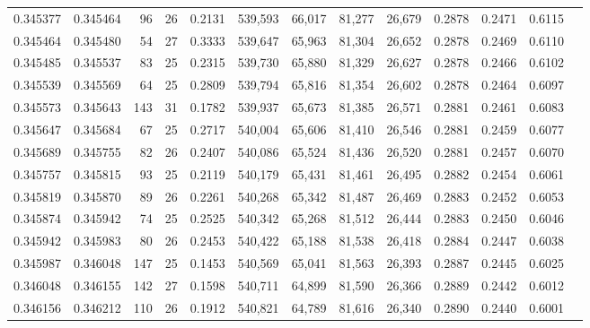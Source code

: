 \begin{tabular}{rrrrrrrrrrrrr}
0.345377 & 0.345464 &    96 &  26 &                                     0.2131 & 539,593 &  66,017 &  81,277 &  26,679 & 0.2878 & 0.2471 & 0.6115 \\
0.345464 & 0.345480 &    54 &  27 &                                     0.3333 & 539,647 &  65,963 &  81,304 &  26,652 & 0.2878 & 0.2469 & 0.6110 \\
0.345485 & 0.345537 &    83 &  25 &                                     0.2315 & 539,730 &  65,880 &  81,329 &  26,627 & 0.2878 & 0.2466 & 0.6102 \\
0.345539 & 0.345569 &    64 &  25 &                                     0.2809 & 539,794 &  65,816 &  81,354 &  26,602 & 0.2878 & 0.2464 & 0.6097 \\
0.345573 & 0.345643 &   143 &  31 &                                     0.1782 & 539,937 &  65,673 &  81,385 &  26,571 & 0.2881 & 0.2461 & 0.6083 \\
0.345647 & 0.345684 &    67 &  25 &                                     0.2717 & 540,004 &  65,606 &  81,410 &  26,546 & 0.2881 & 0.2459 & 0.6077 \\
0.345689 & 0.345755 &    82 &  26 &                                     0.2407 & 540,086 &  65,524 &  81,436 &  26,520 & 0.2881 & 0.2457 & 0.6070 \\
0.345757 & 0.345815 &    93 &  25 &                                     0.2119 & 540,179 &  65,431 &  81,461 &  26,495 & 0.2882 & 0.2454 & 0.6061 \\
0.345819 & 0.345870 &    89 &  26 &                                     0.2261 & 540,268 &  65,342 &  81,487 &  26,469 & 0.2883 & 0.2452 & 0.6053 \\
0.345874 & 0.345942 &    74 &  25 &                                     0.2525 & 540,342 &  65,268 &  81,512 &  26,444 & 0.2883 & 0.2450 & 0.6046 \\
0.345942 & 0.345983 &    80 &  26 &                                     0.2453 & 540,422 &  65,188 &  81,538 &  26,418 & 0.2884 & 0.2447 & 0.6038 \\
0.345987 & 0.346048 &   147 &  25 &                                     0.1453 & 540,569 &  65,041 &  81,563 &  26,393 & 0.2887 & 0.2445 & 0.6025 \\
0.346048 & 0.346155 &   142 &  27 &                                     0.1598 & 540,711 &  64,899 &  81,590 &  26,366 & 0.2889 & 0.2442 & 0.6012 \\
0.346156 & 0.346212 &   110 &  26 &                                     0.1912 & 540,821 &  64,789 &  81,616 &  26,340 & 0.2890 & 0.2440 & 0.6001 \\

\end{tabular}
